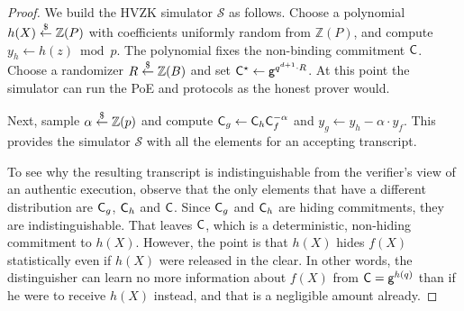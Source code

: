 \begin{proof}
We build the HVZK simulator $\mathcal{S}$ as follows. Choose a polynomial $h(X) \overset{\$}{\gets} \mathbb{Z}(P)$ with coefficients uniformly random from $\mathbb{Z}(P)$, and compute $y_h \gets h(z) \bmod p$. The polynomial fixes the non-binding commitment $\mathsf{C}$. Choose a randomizer $R \overset{\$}{\gets} \mathbb{Z}(B)$ and set $\mathsf{C}^\star \gets \mathsf{g}^{q^{d+1} \cdot R}$. At this point the simulator can run the \textsf{PoE} and \eval protocols as the honest prover would.

Next, sample $\alpha \overset{\$}{\gets} \mathbb{Z}(p)$ and compute $\mathsf{C}_g \gets \mathsf{C}_h \mathsf{C}_f^{-\alpha}$ and $y_g \gets y_h - \alpha \cdot y_f$. This provides the simulator $\mathcal{S}$ with all the elements for an accepting transcript.

To see why the resulting transcript is indistinguishable from the verifier's view of an authentic execution, observe that the only elements that have a different distribution are $\mathsf{C}_g$, $\mathsf{C}_h$ and $\mathsf{C}$. Since $\mathsf{C}_g$ and $\mathsf{C}_h$ are hiding commitments, they are indistinguishable. That leaves $\mathsf{C}$, which is a deterministic, non-hiding commitment to $h(X)$. However, the point is that $h(X)$ hides $f(X)$ statistically even if $h(X)$ were released in the clear. In other words, the distinguisher can learn no more information about $f(X)$ from $\mathsf{C} = \mathsf{g}^{h(q)}$ than if he were to receive $h(X)$ instead, and that is a negligible amount already.
\end{proof}